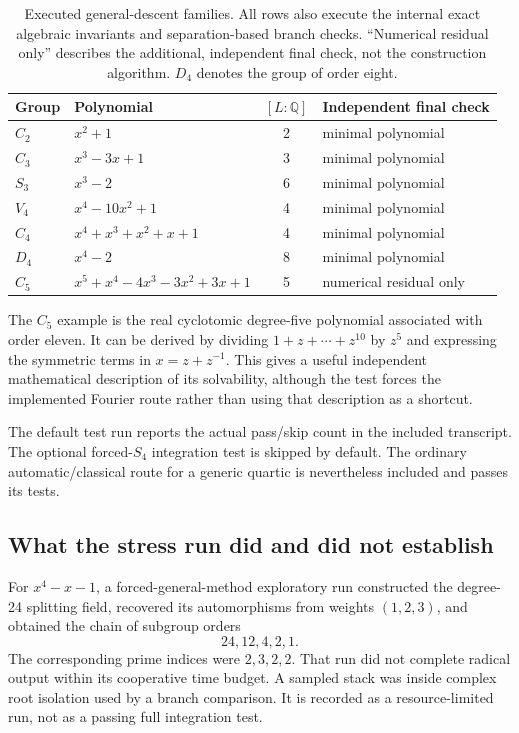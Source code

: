 \documentclass[11pt]{article}
\theoremstyle{definition}\newtheorem{definition}[theorem]{Definition}
\theoremstyle{remark}\newtheorem{remark}[theorem]{Remark}
\newcommand{\Q}{\mathbb Q}\newcommand{\C}{\mathbb C}\newcommand{\Z}{\mathbb Z}
\begin{document}
\begin{table}[ht]
\centering\small
\begin{tabularx}{\linewidth}{@{}lXcl@{}}
\toprule
Group & Polynomial & $[L:\Q]$ & Independent final check \\
\midrule
$C_2$ & $x^2+1$ & 2 & minimal polynomial \\
$C_3$ & $x^3-3x+1$ & 3 & minimal polynomial \\
$S_3$ & $x^3-2$ & 6 & minimal polynomial \\
$V_4$ & $x^4-10x^2+1$ & 4 & minimal polynomial \\
$C_4$ & $x^4+x^3+x^2+x+1$ & 4 & minimal polynomial \\
$D_4$ & $x^4-2$ & 8 & minimal polynomial \\
$C_5$ & $x^5+x^4-4x^3-3x^2+3x+1$ & 5 & numerical residual only \\
\bottomrule
\end{tabularx}
\caption{Executed general-descent families. All rows also execute the internal
exact algebraic invariants and separation-based branch checks. ``Numerical
residual only'' describes the additional, independent final check, not the
construction algorithm. $D_4$ denotes the group of order eight.}\label{tab:tests}
\end{table}

The $C_5$ example is the real cyclotomic degree-five polynomial associated with
order eleven. It can be derived by dividing $1+z+\cdots+z^{10}$ by $z^5$ and
expressing the symmetric terms in $x=z+z^{-1}$. This gives a useful independent
mathematical description of its solvability, although the test forces the
implemented Fourier route rather than using that description as a shortcut.

The default test run reports the actual pass/skip count in the included
transcript. The optional forced-$S_4$ integration test is skipped by default.
The ordinary automatic/classical route for a generic quartic is nevertheless
included and passes its tests.

\subsection{What the stress run did and did not establish}

For $x^4-x-1$, a forced-general-method exploratory run constructed the degree-24
splitting field, recovered its automorphisms from weights $(1,2,3)$, and obtained
the chain of subgroup orders
\begin{equation}
 24,12,4,2,1.
\end{equation}
The corresponding prime indices were $2,3,2,2$. That run did not complete
radical output within its cooperative time budget. A sampled stack was inside
complex root isolation used by a branch comparison. It is recorded as a
resource-limited run, not as a passing full integration test.
\end{document}
